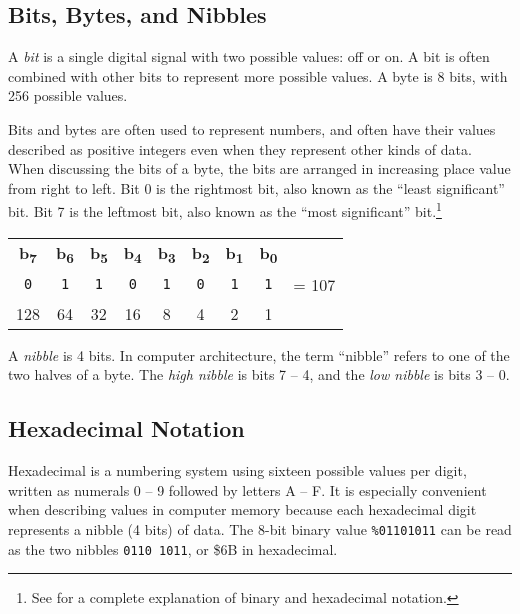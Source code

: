 \subsection{Bits, Bytes, and Nibbles}

A {\em bit} is a single digital signal with two possible values: off or on. A bit is often combined with other bits to represent more possible values. A byte is 8 bits, with 256 possible values.

Bits and bytes are often used to represent numbers, and often have their values described as positive integers even when they represent other kinds of data. When discussing the bits of a byte, the bits are arranged in increasing place value from right to left. Bit 0 is the rightmost bit, also known as the ``least significant'' bit.  Bit 7 is the leftmost bit, also known as the ``most significant'' bit.\footnote{See  for a complete explanation of binary and hexadecimal notation.}

\begin{center}
\begin{tabular}{ccccccccl}
{\bf b\textsubscript{7}} &
{\bf b\textsubscript{6}} &
{\bf b\textsubscript{5}} &
{\bf b\textsubscript{4}} &
{\bf b\textsubscript{3}} &
{\bf b\textsubscript{2}} &
{\bf b\textsubscript{1}} &
{\bf b\textsubscript{0}} & \\
\huge\texttt{0} &
\huge\texttt{1} &
\huge\texttt{1} &
\huge\texttt{0} &
\huge\texttt{1} &
\huge\texttt{0} &
\huge\texttt{1} &
\huge\texttt{1} & = 107 \\
\small{}128 &
\small{}64 &
\small{}32 &
\small{}16 &
\small{}8 &
\small{}4 &
\small{}2 &
\small{}1 & \\
\end{tabular}
\end{center}

A {\em nibble} is 4 bits. In computer architecture, the term ``nibble'' refers to one of the two halves of a byte. The {\em high nibble} is bits 7 -- 4, and the {\em low nibble} is bits 3 -- 0.

\subsection{Hexadecimal Notation}

Hexadecimal is a numbering system using sixteen possible values per digit, written as numerals 0 -- 9 followed by letters A -- F. It is especially convenient when describing values in computer memory because each hexadecimal digit represents a nibble (4 bits) of data. The 8-bit binary value \texttt{\%01101011} can be read as the two nibbles \texttt{0110 1011}, or \$6B in hexadecimal.

